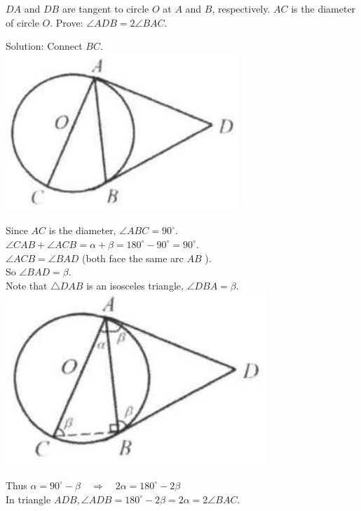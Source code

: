 \documentclass{article}
\begin{document}
\(D A\) and \(D B\) are tangent to circle \(O\) at \(A\) and \(B\), respectively. \(A C\) is the diameter of circle \(O\). Prove: \(\angle A D B=2 \angle B A C\).

Solution:
Connect \(B C\).\\
\centering
\includegraphics[width=\textwidth]{images/163(2).jpg}

Since \(A C\) is the diameter, \(\angle A B C=90^{\circ}\).\\
\(\angle C A B+\angle A C B=\alpha+\beta=180^{\circ}-90^{\circ}=90^{\circ}\).\\
\(\angle A C B=\angle B A D\) (both face the same arc \(A B\) ).\\
So \(\angle B A D=\beta\).\\
Note that \(\triangle D A B\) is an isosceles triangle, \(\angle D B A=\beta\).\\
\centering
\includegraphics[width=\textwidth]{images/163(4).jpg}

Thus \(\alpha=90^{\circ}-\beta \quad \Rightarrow \quad 2 \alpha=180^{\circ}-2 \beta\)\\
In triangle \(A D B, \angle A D B=180^{\circ}-2 \beta=2 \alpha=2 \angle B A C\).
\end{document}
